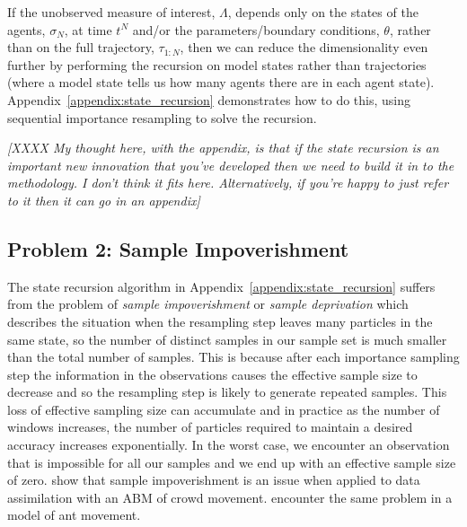 \documentclass{article}
\begin{document}
If the unobserved measure of interest, $\Lambda$, depends only on the states of the agents, $\sigma_N$, at time $t^N$ and/or the parameters/boundary conditions, $\theta$, rather than on the full trajectory, $\tau_{1:N}$, then we can reduce the dimensionality even further by performing the recursion on model states rather than trajectories (where a model state tells us how many agents there are in each agent state). Appendix~\ref{appendix:state_recursion} demonstrates how to do this, using sequential importance resampling to solve the recursion.

\textit{[XXXX My thought here, with the appendix, is that if the state recursion is an important new innovation that you've developed then we need to build it in to the methodology. I don't think it fits here. Alternatively, if you're happy to just refer to it then it can go in an appendix]}

\subsection{Problem 2: Sample Impoverishment}

The state recursion algorithm in Appendix~\ref{appendix:state_recursion} suffers from the problem of \textit{sample impoverishment} \citep{li2014fight} or \textit{sample deprivation} which describes the situation when the resampling step leaves many particles in the same state, so the number of distinct samples in our sample set is much smaller than the total number of samples. This is because after each importance sampling step the information in the observations causes the effective sample size to decrease and so the resampling step is likely to generate repeated samples. This loss of effective sampling size can accumulate and in practice as the number of windows increases, the number of particles required to maintain a desired accuracy increases exponentially. In the worst case, we encounter an observation that is impossible for all our samples and we end up with an effective sample size of zero. \citet{malleson_simulating_2020} show that sample impoverishment is an issue when applied to data assimilation with an ABM of crowd movement. \citet{khan2003efficient} encounter the same problem in a model of ant movement.
\end{document}
